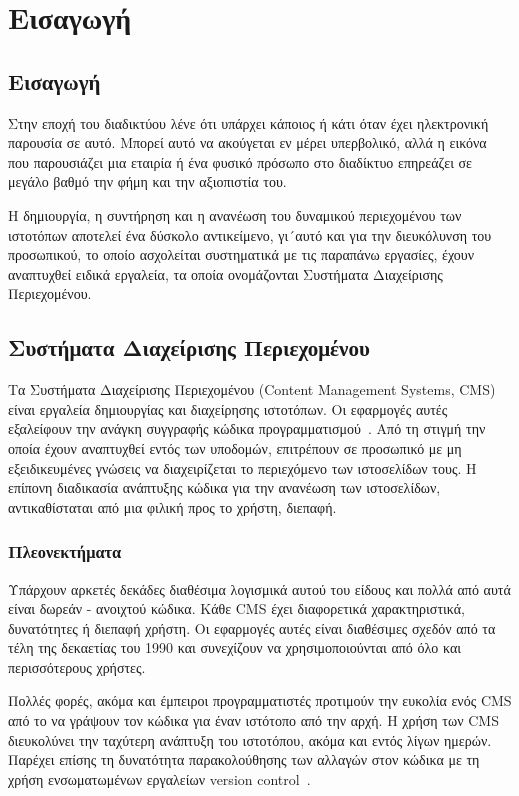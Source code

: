\documentclass[12pt]{report}
\begin{document}
\hypersetup{pageanchor=true}
\clearpage
{}

\chapter{Εισαγωγή}\label{ch1}
\section{Εισαγωγή}
Στην εποχή του διαδικτύου λένε ότι υπάρχει κάποιος ή κάτι όταν έχει ηλεκτρονική παρουσία σε αυτό. Μπορεί αυτό να ακούγεται εν μέρει υπερβολικό, αλλά η εικόνα που παρουσιάζει μια εταιρία ή ένα φυσικό πρόσωπο στο διαδίκτυο επηρεάζει σε μεγάλο βαθμό την φήμη και την αξιοπιστία του.

Η δημιουργία, η συντήρηση και η ανανέωση του δυναμικού περιεχομένου των ιστοτόπων αποτελεί ένα δύσκολο αντικείμενο, γι´αυτό και για την διευκόλυνση του προσωπικού, το οποίο ασχολείται συστηματικά με τις παραπάνω εργασίες, έχουν αναπτυχθεί ειδικά εργαλεία, τα οποία ονομάζονται Συστήματα Διαχείρισης Περιεχομένου.

\section{Συστήματα Διαχείρισης Περιεχομένου}
Τα Συστήματα Διαχείρισης Περιεχομένου (\textlatin{Content Management Systems, CMS}) είναι εργαλεία δημιουργίας και διαχείρησης ιστοτόπων. Οι εφαρμογές αυτές εξαλείφουν την ανάγκη συγγραφής κώδικα προγραμματισμού~\cite{linode}. Από τη στιγμή την οποία έχουν αναπτυχθεί εντός των υποδομών, επιτρέπουν σε προσωπικό με μη εξειδικευμένες γνώσεις να διαχειρίζεται το περιεχόμενο των ιστοσελίδων τους.
Η επίπονη διαδικασία ανάπτυξης κώδικα για την ανανέωση των ιστοσελίδων, αντικαθίσταται από μια φιλική προς το χρήστη, διεπαφή.

\subsection{Πλεονεκτήματα}
Υπάρχουν αρκετές δεκάδες διαθέσιμα λογισμικά αυτού του είδους και πολλά από αυτά είναι δωρεάν - ανοιχτού κώδικα. Κάθε \textlatin{CMS} έχει διαφορετικά χαρακτηριστικά, δυνατότητες ή διεπαφή χρήστη. Οι εφαρμογές αυτές είναι διαθέσιμες σχεδόν από τα τέλη της δεκαετίας του 1990 και συνεχίζουν να χρησιμοποιούνται από όλο και περισσότερους χρήστες.

Πολλές φορές, ακόμα και έμπειροι προγραμματιστές προτιμούν την ευκολία ενός \textlatin{CMS} από το να γράψουν τον κώδικα για έναν ιστότοπο από την αρχή. Η χρήση των \textlatin{CMS} διευκολύνει την ταχύτερη ανάπτυξη του ιστοτόπου, ακόμα και εντός λίγων ημερών. Παρέχει επίσης τη δυνατότητα παρακολούθησης των αλλαγών στον κώδικα με τη χρήση ενσωματωμένων εργαλείων \textlatin{version control}~\cite{wikipedia_2017:02}.
\end{document}
